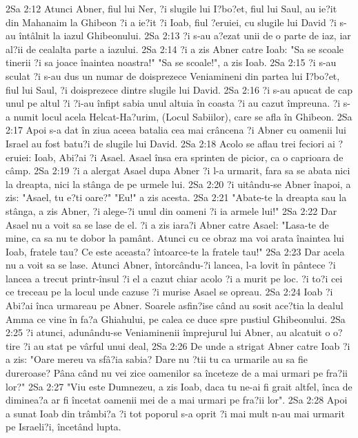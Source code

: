 2Sa 2:12  Atunci Abner, fiul lui Ner, ?i slugile lui I?bo?et, fiul lui Saul, au ie?it din Mahanaim la Ghibeon ?i a ie?it ?i Ioab, fiul ?eruiei, cu slugile lui David ?i s-au întâlnit la iazul Ghibeonului.
2Sa 2:13  ?i s-au a?ezat unii de o parte de iaz, iar al?ii de cealalta parte a iazului.
2Sa 2:14  ?i a zis Abner catre Ioab: "Sa se scoale tinerii ?i sa joace înaintea noastra!" "Sa se scoale!", a zis Ioab.
2Sa 2:15  ?i s-au sculat ?i s-au dus un numar de doisprezece Veniamineni din partea lui I?bo?et, fiul lui Saul, ?i doisprezece dintre slugile lui David.
2Sa 2:16  ?i s-au apucat de cap unul pe altul ?i ?i-au înfipt sabia unul altuia în coasta ?i au cazut împreuna. ?i s-a numit locul acela Helcat-Ha?urim, (Locul Sabiilor), care se afla în Ghibeon.
2Sa 2:17  Apoi s-a dat în ziua aceea batalia cea mai crâncena ?i Abner cu oamenii lui Israel au fost batu?i de slugile lui David.
2Sa 2:18  Acolo se aflau trei feciori ai ?eruiei: Ioab, Abi?ai ?i Asael. Asael însa era sprinten de picior, ca o caprioara de câmp.
2Sa 2:19  ?i a alergat Asael dupa Abner ?i l-a urmarit, fara sa se abata nici la dreapta, nici la stânga de pe urmele lui.
2Sa 2:20  ?i uitându-se Abner înapoi, a zis: "Asael, tu e?ti oare?" "Eu!" a zis acesta.
2Sa 2:21  "Abate-te la dreapta sau la stânga, a zis Abner, ?i alege-?i unul din oameni ?i ia armele lui!"
2Sa 2:22  Dar Asael nu a voit sa se lase de el. ?i a zis iara?i Abner catre Asael: "Lasa-te de mine, ca sa nu te dobor la pamânt. Atunci cu ce obraz ma voi arata înaintea lui Ioab, fratele tau? Ce este aceasta? întoarce-te la fratele tau!"
2Sa 2:23  Dar acela nu a voit sa se lase. Atunci Abner, întorcându-?i lancea, l-a lovit în pântece ?i lancea a trecut printr-însul ?i el a cazut chiar acolo ?i a murit pe loc. ?i to?i cei ce treceau pe la locul unde cazuse ?i murise Asael se opreau.
2Sa 2:24  Ioab ?i Abi?ai înca urmareau pe Abner. Soarele asfin?ise când au sosit ace?tia la dealul Amma ce vine în fa?a Ghiahului, pe calea ce duce spre pustiul Ghibeonului.
2Sa 2:25  ?i atunci, adunându-se Veniaminenii împrejurul lui Abner, au alcatuit o o?tire ?i au stat pe vârful unui deal,
2Sa 2:26  De unde a strigat Abner catre Ioab ?i a zis: "Oare mereu va sfâ?ia sabia? Dare nu ?tii tu ca urmarile au sa fie dureroase? Pâna când nu vei zice oamenilor sa înceteze de a mai urmari pe fra?ii lor?"
2Sa 2:27  "Viu este Dumnezeu, a zis Ioab, daca tu ne-ai fi grait altfel, înca de diminea?a ar fi încetat oamenii mei de a mai urmari pe fra?ii lor".
2Sa 2:28  Apoi a sunat Ioab din trâmbi?a ?i tot poporul s-a oprit ?i mai mult n-au mai urmarit pe Israeli?i, încetând lupta.
